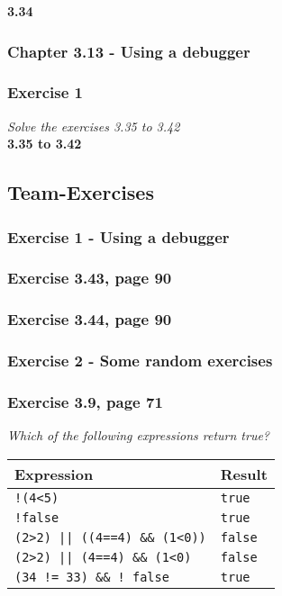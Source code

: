 \textbf{3.34} 

\subsubsection{Chapter 3.13 - Using a debugger}

\subsubsection*{Exercise 1}
\textit{Solve the exercises 3.35 to 3.42}\\

\textbf{3.35 to 3.42} 



\subsection{Team-Exercises}

\subsubsection{Exercise 1 - Using a debugger}

\subsubsection*{Exercise 3.43, page 90}

\subsubsection*{Exercise 3.44, page 90}

\subsubsection{Exercise 2 - Some random exercises}

\subsubsection*{Exercise 3.9, page 71}

\textit{Which of the following expressions return true?}
\begin{table}[h!]
	\begin{tabular}{l l}
		Expression & Result \\
		\hline
		\lstinline?!(4<5)? & \lstinline!true! \\
		\lstinline?!false? & \lstinline!true! \\
		\lstinline?(2>2) || ((4==4) && (1<0))? & \lstinline!false! \\
		\lstinline?(2>2) || (4==4) && (1<0)? & \lstinline!false! \\
		\lstinline?(34 != 33) && ! false? & \lstinline!true!  \\
	\end{tabular}
\end{table}

